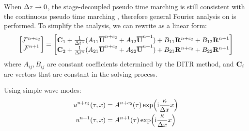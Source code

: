 When ${\Delta} \tau \rightarrow 0$, the stage-decoupled pseudo time marching
 is still consistent with the continuous
pseudo time marching , therefore
general Fourier analysis on  is performed.
To simplify the analysis, we can rewrite 
as a linear form:
\begin{equation}
    \begin{bmatrix}
        \mathcal{F}^{n+c_2} \\
        \mathcal{F}^{n+1}
    \end{bmatrix}
    =
    \begin{bmatrix}
        \mathbf{C}_1 + \frac{1}{{\Delta} t^n}(A_{11}\overline{\mathbf{U}}^{n+c_2} + A_{12}\overline{\mathbf{U}}^{n+1})
        + B_{11}\mathbf{R}^{n+c_2} + B_{12}\mathbf{R}^{n+1} \\
        \mathbf{C}_2 + \frac{1}{{\Delta} t^n}(A_{21}\overline{\mathbf{U}}^{n+c_2} + A_{22}\overline{\mathbf{U}}^{n+1})
        + B_{21}\mathbf{R}^{n+c_2} + B_{22}\mathbf{R}^{n+1}
    \end{bmatrix}
    \label{eq:linearDITRFF}
\end{equation}
where $A_{ij},B_{ij}$ are constant coefficients
determined by the DITR method, and $\mathbf{C}_i$ are
vectors that are constant in the solving process.

Using simple wave modes:
\begin{equation}
    \begin{aligned}
        u^{n+c_2}(\tau,x) & = A^{n+c_2}(\tau)\exp(\mathrm{i} \frac{\kappa}{{\Delta} x} x) \\
        u^{n+1}(\tau,x)   & = A^{n+1}(\tau)\exp(\mathrm{i} \frac{\kappa}{{\Delta} x} x)
    \end{aligned}
\end{equation}

